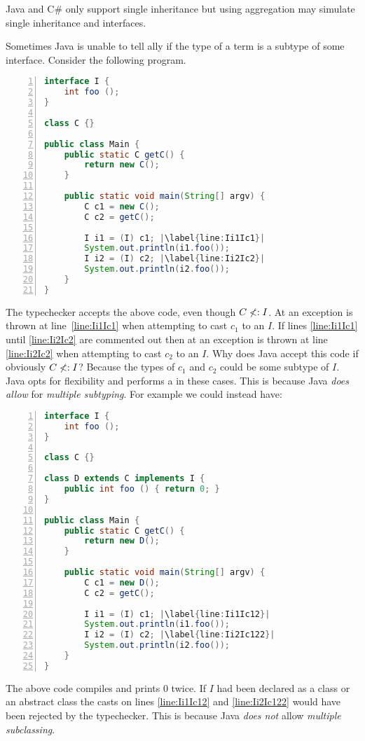 \documentclass{article}
\begin{document}
\begin{remark}\label{remark:multipleinheritancejava}
Java and C\# only support single inheritance but using aggregation may simulate single inheritance and interfaces.
\end{remark}

\begin{example}
  Sometimes Java is unable to tell \static{}ally if the \dynamic{} type of a term is a subtype of some interface.
  Consider the following program.
\begin{lstlisting}[language=Java, numbers=left, escapechar=|]
interface I {
    int foo ();
}

class C {}

public class Main {
    public static C getC() {
        return new C();
    }

    public static void main(String[] argv) {
        C c1 = new C();
        C c2 = getC();

        I i1 = (I) c1; |\label{line:Ii1Ic1}|
        System.out.println(i1.foo());
        I i2 = (I) c2; |\label{line:Ii2Ic2}|
        System.out.println(i2.foo());
    }
}
\end{lstlisting}
  The typechecker accepts the above code, even though $C \nless: I$.
  At \runtime{} an exception is thrown at line~\ref{line:Ii1Ic1} when attempting to cast $c_1$ to an $I$.
  If lines \ref{line:Ii1Ic1} until \ref{line:Ii2Ic2} are commented out then at \runtime{} an exception is thrown at line \ref{line:Ii2Ic2} when attempting to cast $c_2$ to an $I$.
  Why does Java accept this code if obviously $C \nless: I$?
  Because the \dynamic{} types of $c_1$ and $c_2$ could be some subtype of $I$.
  Java opts for flexibility and performs a \textit{\runtimecheck{}} in these cases.
  This is because Java \textit{does allow} for \textit{multiple subtyping}.
  For example we could instead have:
\begin{lstlisting}[language=Java, numbers=left, escapechar=|]
interface I {
    int foo ();
}

class C {}

class D extends C implements I {
    public int foo () { return 0; }
}

public class Main {
    public static C getC() {
        return new D();
    }

    public static void main(String[] argv) {
        C c1 = new D();
        C c2 = getC();

        I i1 = (I) c1; |\label{line:Ii1Ic12}|
        System.out.println(i1.foo());
        I i2 = (I) c2; |\label{line:Ii2Ic122}|
        System.out.println(i2.foo());
    }
}
\end{lstlisting}
  The above code compiles and prints $0$ twice.
  If $I$ had been declared as a class or an abstract class the casts on lines \ref{line:Ii1Ic12} and \ref{line:Ii2Ic122} would have been rejected by the typechecker.
  This is because Java \textit{does not} allow \textit{multiple subclassing}.
\end{example}
\end{document}
